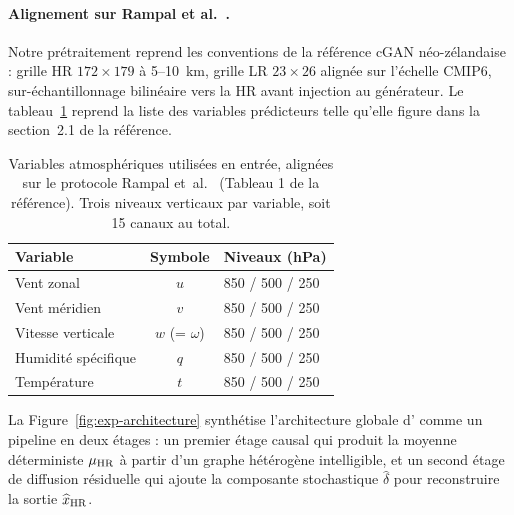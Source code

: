 \paragraph{Alignement sur Rampal et al.~\cite{rampal_cgan_2024}.} Notre prétraitement reprend les conventions de la référence cGAN néo-zélandaise : grille HR $172 \times 179$ à 5--10~km, grille LR $23 \times 26$ alignée sur l'échelle CMIP6, sur-échantillonnage bilinéaire vers la HR avant injection au générateur. Le tableau~\ref{tab:exp-data-rampal} reprend la liste des variables prédicteurs telle qu'elle figure dans la section~2.1 de la référence.

\begin{table}[ht]
  \centering
  \small
  \caption[Variables LR utilisées]{Variables atmosphériques \LR{} utilisées en entrée, alignées sur le protocole Rampal et~al.~\cite{rampal_cgan_2024} (Tableau 1 de la référence). Trois niveaux verticaux par variable, soit 15 canaux au total.}
  \label{tab:exp-data-rampal}
  \begin{tabular}{l c l}
    \toprule
    \textbf{Variable} & \textbf{Symbole} & \textbf{Niveaux (hPa)} \\
    \midrule
    Vent zonal & $u$ & 850 / 500 / 250 \\
    Vent méridien & $v$ & 850 / 500 / 250 \\
    Vitesse verticale & $w$ (= $\omega$) & 850 / 500 / 250 \\
    Humidité spécifique & $q$ & 850 / 500 / 250 \\
    Température & $t$ & 850 / 500 / 250 \\
    \bottomrule
  \end{tabular}
\end{table}

\label{sec:exp-topo}

La Figure~\ref{fig:exp-architecture} synthétise l'architecture globale d'\Oracle{} comme un pipeline en deux étages : un premier étage causal qui produit la moyenne déterministe $\mu_{\text{HR}}$ à partir d'un graphe hétérogène intelligible, et un second étage de diffusion résiduelle qui ajoute la composante stochastique $\widehat\delta$ pour reconstruire la sortie $\widehat{x}_{\text{HR}}$.

